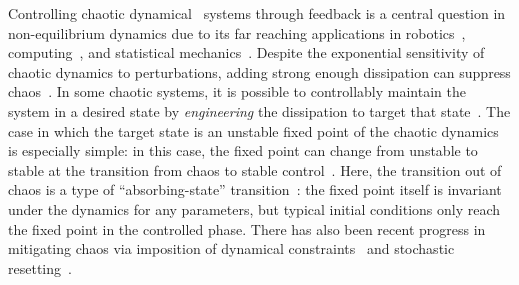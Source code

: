 \documentclass[twocolumn,amsmath,amssymb,floatfix,superscriptaddress,aps,prl]{revtex4-2}
\begin{document}
\maketitle
 
Controlling chaotic dynamical~\cite{ott2002chaos, strogatz2001nonlinear,B2000,GD93,EB2003} systems through feedback is a central question in non-equilibrium dynamics due to its  far reaching applications in robotics~\cite{de2018mimicking}, computing~\cite{sinha1998dynamics}, and statistical mechanics~\cite{robledo2013generalized}. %
Despite the exponential sensitivity of chaotic dynamics to perturbations, 
adding strong enough dissipation 
can suppress chaos~\cite{PhysRevLett.64.1196,pyragas1992continuous,antoniou1997probabilistic}.  In some chaotic systems, it is possible to controllably maintain the system in a desired state by \emph{engineering} the dissipation to target that state~\cite{krechetnikov2007dissipation}. 
%
The case in which the target state is an unstable fixed point of the chaotic dynamics is especially simple: in this case, the fixed point can change from unstable to stable at the transition from chaos to stable control~\cite{PhysRevLett.64.1196}. Here, the transition out of chaos is a type of ``absorbing-state'' transition~\cite{tauber2014critical}: the fixed point itself is invariant under the dynamics for any parameters, but typical initial conditions only reach the fixed point in the controlled phase. There has also been recent progress in mitigating chaos via imposition of dynamical constraints~\cite{SR1,SR2} and stochastic resetting~\cite{AK1,AK2}.
%
\end{document}
